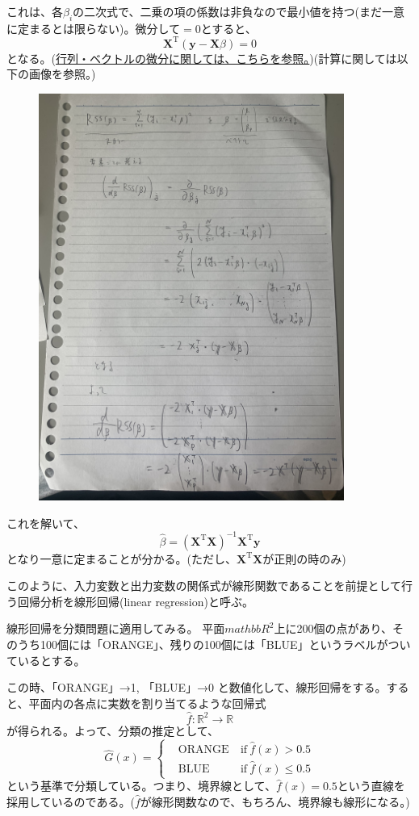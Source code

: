 \documentclass{jsarticle}
\begin{document}
これは、各$\beta_i$の二次式で、二乗の項の係数は非負なので最小値を持つ(まだ一意に定まるとは限らない)。微分して$=0$とすると、
\[
  \mathbf{X}^\mathrm{T}(\mathbf{y}-\mathbf{X}\beta)=0
\]
となる。(\href{https://qiita.com/AnchorBlues/items/8fe2483a3a72676eb96d}{行列・ベクトルの微分に関しては、こちらを参照。})(計算に関しては以下の画像を参照。)
\begin{figure}[h]
  \includegraphics[width=100mm, angle=270]{fig-cal-2.jpg}
\end{figure}


これを解いて、
\[
  \hat{\beta}=(\mathbf{X}^\mathrm{T}\mathbf{X})^{-1}\mathbf{X}^\mathrm{T}\mathbf{y}
\]
となり一意に定まることが分かる。(ただし、$\mathbf{X}^\mathrm{T}\mathbf{X}$が正則の時のみ)

このように、入力変数と出力変数の関係式が線形関数であることを前提として行う回帰分析を線形回帰(linear regression)と呼ぶ。

線形回帰を分類問題に適用してみる。
平面$mathbb{R}^2$上に200個の点があり、そのうち100個には「ORANGE」、残りの100個には「BLUE」というラベルがついているとする。

この時、「ORANGE」→1, 「BLUE」→0 と数値化して、線形回帰をする。すると、平面内の各点に実数を割り当てるような回帰式
\[
  \hat{f} \colon \mathbb{R}^2 \to \mathbb{R}
\]
が得られる。よって、分類の推定として、
\[
  \hat{G}(x) = \left \{
  \begin{align}
    &\mbox{ORANGE} \ &\mathrm{if} \ \hat{f}(x) > 0.5 \\
    &\mbox{BLUE}  \ &\mathrm{if} \ \hat{f}(x) \le 0.5
  \end{align}
  \right .
\]
という基準で分類している。つまり、境界線として、$\hat{f}(x)=0.5$という直線を採用しているのである。($\hat{f}$が線形関数なので、もちろん、境界線も線形になる。)
\end{document}
